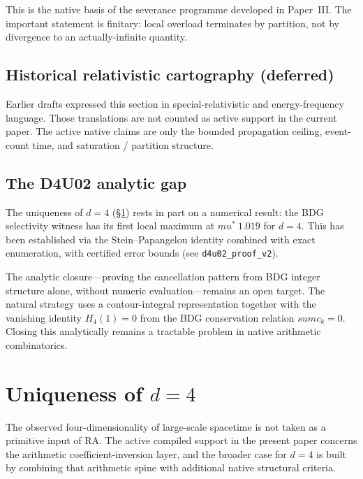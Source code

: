 \documentclass[11pt]{article}
\def\mu{mu}%
\def\approx{~}%
\def\sum{sum}%
\begin{document}
This is the native basis of the severance programme developed in Paper~III. The important statement is finitary: local overload terminates by partition, not by divergence to an actually-infinite quantity.

\subsection{Historical relativistic cartography (deferred)}

Earlier drafts expressed this section in special-relativistic and energy-frequency language. Those translations are not counted as active support in the current paper. The active native claims are only the bounded propagation ceiling, event-count time, and saturation / partition structure.

\subsection{The D4U02 analytic gap}
\label{sec:d4u02_gap}

The uniqueness of $d=4$ (\S\ref{sec:d4}) rests in part on a numerical result: the BDG selectivity witness has its first local maximum at $\mu^*\approx 1.019$ for $d=4$. This has been established via the Stein--Papangelou identity combined with exact enumeration, with certified error bounds (see \texttt{d4u02\_proof\_v2}).

The analytic closure---proving the cancellation pattern from BDG integer structure alone, without numeric evaluation---remains an open target. The natural strategy uses a contour-integral representation together with the vanishing identity $H_4(1)=0$ from the BDG conservation relation $\sum c_k=0$. Closing this analytically remains a tractable problem in native arithmetic combinatorics.

\section{Uniqueness of $d=4$}
\label{sec:d4}

The observed four-dimensionality of large-scale spacetime is not taken as a primitive input of RA. The active compiled support in the present paper concerns the arithmetic coefficient-inversion layer, and the broader case for $d=4$ is built by combining that arithmetic spine with additional native structural criteria.
\end{document}
